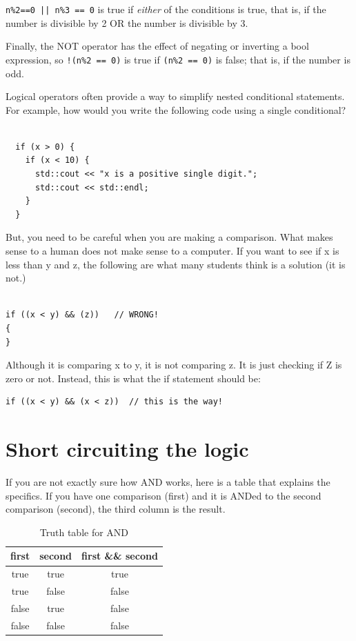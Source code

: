 
{\tt n\%2==0 || n\%3 == 0} is true if {\em either} of
the conditions is true, that is, if the number is divisible by 2 OR the
number is divisible by 3.

Finally, the NOT operator has the effect of negating or
inverting a bool expression, so {\tt !(n\%2 == 0)} is true
if {\tt (n\%2 == 0)} is false; that is, if the number is odd.


Logical operators often provide a way to simplify nested
conditional statements.  For example, how would you write
the following code using a single conditional?

\begin{lstlisting}
  
  if (x > 0) {
    if (x < 10) {
      std::cout << "x is a positive single digit.";
      std::cout << std::endl;
    }
  }
\end{lstlisting}

But, you need to be careful when you are making a comparison. What makes sense to a human does not make sense to a computer. If you want to see if x is less than y and z, the following are what many students think is a solution (it is not.)

\begin{lstlisting}

if ((x < y) && (z))   // WRONG!
{
}
\end{lstlisting}
Although it is comparing x to y, it is not comparing z. It is just checking if Z is zero or not. Instead, this is what the if statement should be:
\begin{lstlisting}
if ((x < y) && (x < z))  // this is the way!  
\end{lstlisting}


\section{Short circuiting the logic}
If you are not exactly sure how AND works, here is a table that explains the specifics. If you have one comparison (first) and it is ANDed to the second comparison (second), the third column is the result.
\begin{table}[h]
\centering
\begin{tabular}{ | c | c | c | }
\hline
 first & second & first \&\& second \\\hline
 true & true & true \\ 
 true & false & false \\  
 false & true & false \\
 false & false & false \\
\hline
\end{tabular}
    \caption{Truth table for AND}
    \label{tab:andtruth}
\end{table}

